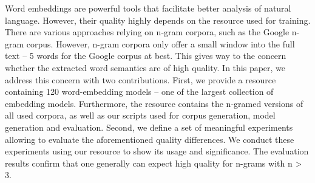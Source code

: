 Word embeddings are powerful tools that facilitate better analysis of natural language. However, their quality highly depends on the resource used for training. There are various approaches relying on n-gram corpora, such as the Google n-gram corpus. However, n-gram corpora only offer a small window into the full text -- 5 words for the Google corpus at best. This gives way to the concern whether the extracted word semantics are of high quality. In this paper, we address this concern with two contributions. First, we provide a resource containing 120 word-embedding models -- one of the largest collection of embedding models. Furthermore, the resource contains the n-gramed versions of all used corpora, as well as our scripts used for corpus generation, model generation and evaluation. Second, we define a set of meaningful experiments allowing to evaluate the aforementioned quality differences. We conduct these experiments using our resource to show its usage and significance. The evaluation results confirm that one generally can expect high quality for n-grams with n > 3.
